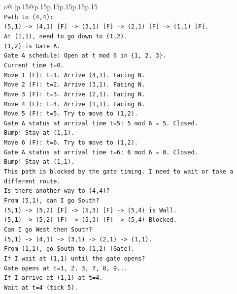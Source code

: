 \documentclass{article}
\begin{document}
{\begin{supertabular}{c@{$\;$}|p{.15\linewidth}@{}p{.15\linewidth}p{.15\linewidth}p{.15\linewidth}p{.15\linewidth}p{.15\linewidth}}
{{{\\ 
\texttt{Path to (4,4):} \\
\texttt{(5,1) {-}> (4,1) {[}F{]} {-}> (3,1) {[}F{]} {-}> (2,1) {[}F{]} {-}> (1,1) {[}F{]}.} \\
\texttt{At (1,1), need to go down to (1,2).} \\
\texttt{(1,2) is Gate A.} \\
\texttt{Gate A schedule: Open at t mod 6 in \{1, 2, 3\}.} \\
\texttt{Current time t=0.} \\
\texttt{Move 1 (F): t=1. Arrive (4,1). Facing N.} \\
\texttt{Move 2 (F): t=2. Arrive (3,1). Facing N.} \\
\texttt{Move 3 (F): t=3. Arrive (2,1). Facing N.} \\
\texttt{Move 4 (F): t=4. Arrive (1,1). Facing N.} \\
\texttt{Move 5 (F): t=5. Try to move to (1,2).} \\
\texttt{Gate A status at arrival time t=5: 5 mod 6 = 5. Closed.} \\
\texttt{Bump! Stay at (1,1).} \\
\texttt{Move 6 (F): t=6. Try to move to (1,2).} \\
\texttt{Gate A status at arrival time t=6: 6 mod 6 = 0. Closed.} \\
\texttt{Bump! Stay at (1,1).} \\
\texttt{This path is blocked by the gate timing. I need to wait or take a different route.} \\
\texttt{Is there another way to (4,4)?} \\
\texttt{From (5,1), can I go South?} \\
\texttt{(5,1) {-}> (5,2) {[}F{]} {-}> (5,3) {[}F{]} {-}> (5,4) is Wall.} \\
\texttt{(5,1) {-}> (5,2) {[}F{]} {-}> (5,3) {[}F{]} {-}> (5,4) Blocked.} \\
\texttt{Can I go West then South?} \\
\texttt{(5,1) {-}> (4,1) {-}> (3,1) {-}> (2,1) {-}> (1,1).} \\
\texttt{From (1,1), go South to (1,2) {[}Gate{]}.} \\
\texttt{If I wait at (1,1) until the gate opens?} \\
\texttt{Gate opens at t=1, 2, 3, 7, 8, 9...} \\
\texttt{If I arrive at (1,1) at t=4.} \\
\texttt{Wait at t=4 (tick 5).} \\
}}}
\end{supertabular}}
\end{document}
